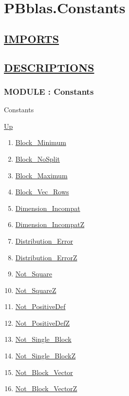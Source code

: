 \chapter*{PBblas.Constants}
\hypertarget{ecldoc:toc:PBblas.Constants}{}

\section*{\underline{IMPORTS}}

\section*{\underline{DESCRIPTIONS}}
\subsection*{MODULE : Constants}
\hypertarget{ecldoc:PBblas.Constants}{}
\begin{minipage}[t]{\textwidth}
\begin{flushleft}
 Constants 
\end{flushleft}
\end{minipage}
\hyperlink{ecldoc:toc:PBblas}{Up}

\par
\par
\begin{enumerate}
\item \hyperlink{ecldoc:pbblas.constants.block_minimum}{Block\_Minimum}
\item \hyperlink{ecldoc:pbblas.constants.block_nosplit}{Block\_NoSplit}
\item \hyperlink{ecldoc:pbblas.constants.block_maximum}{Block\_Maximum}
\item \hyperlink{ecldoc:pbblas.constants.block_vec_rows}{Block\_Vec\_Rows}
\item \hyperlink{ecldoc:pbblas.constants.dimension_incompat}{Dimension\_Incompat}
\item \hyperlink{ecldoc:pbblas.constants.dimension_incompatz}{Dimension\_IncompatZ}
\item \hyperlink{ecldoc:pbblas.constants.distribution_error}{Distribution\_Error}
\item \hyperlink{ecldoc:pbblas.constants.distribution_errorz}{Distribution\_ErrorZ}
\item \hyperlink{ecldoc:pbblas.constants.not_square}{Not\_Square}
\item \hyperlink{ecldoc:pbblas.constants.not_squarez}{Not\_SquareZ}
\item \hyperlink{ecldoc:pbblas.constants.not_positivedef}{Not\_PositiveDef}
\item \hyperlink{ecldoc:pbblas.constants.not_positivedefz}{Not\_PositiveDefZ}
\item \hyperlink{ecldoc:pbblas.constants.not_single_block}{Not\_Single\_Block}
\item \hyperlink{ecldoc:pbblas.constants.not_single_blockz}{Not\_Single\_BlockZ}
\item \hyperlink{ecldoc:pbblas.constants.not_block_vector}{Not\_Block\_Vector}
\item \hyperlink{ecldoc:pbblas.constants.not_block_vectorz}{Not\_Block\_VectorZ}
\end{enumerate}
